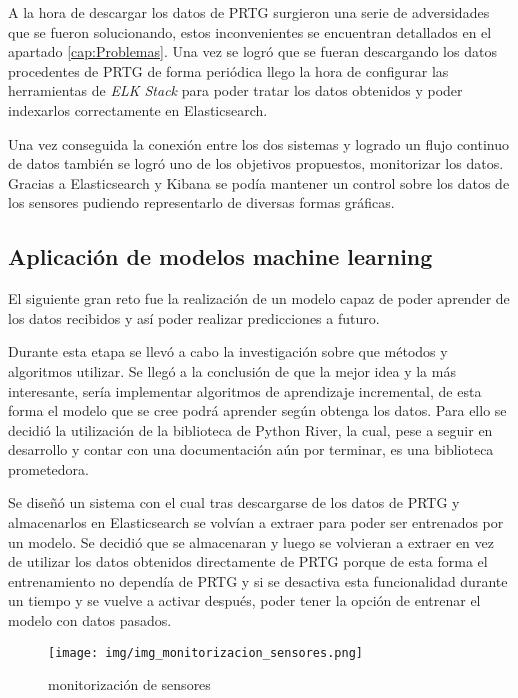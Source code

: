 A la hora de descargar los datos de PRTG surgieron una serie de adversidades que se fueron solucionando, estos inconvenientes se encuentran detallados en el apartado \ref{cap:Problemas}. Una vez se logró que se fueran descargando los datos procedentes de PRTG de forma periódica llego la hora de configurar las herramientas de \textit{ELK Stack} para poder tratar los datos obtenidos y poder indexarlos correctamente en Elasticsearch.

Una vez conseguida la conexión entre los dos sistemas y logrado un flujo continuo de datos también se logró uno de los objetivos propuestos, monitorizar los datos. Gracias a Elasticsearch y Kibana se podía mantener un control sobre los datos de los sensores pudiendo representarlo de diversas formas gráficas.

\subsection{Aplicación de modelos machine learning}

El siguiente gran reto fue la realización de un modelo capaz de poder aprender de los datos recibidos y así poder realizar predicciones a futuro.

Durante esta etapa se llevó a cabo la investigación sobre que métodos y algoritmos utilizar. Se llegó a la conclusión de que la mejor idea y la más interesante, sería implementar algoritmos de aprendizaje incremental, de esta forma el modelo que se cree podrá aprender según obtenga los datos. Para ello se decidió la utilización de la biblioteca de Python River, la cual, pese a seguir en desarrollo y contar con una documentación aún por terminar, es una biblioteca prometedora.

Se diseñó un sistema con el cual tras descargarse de los datos de PRTG y almacenarlos en Elasticsearch se volvían a extraer para poder ser entrenados por un modelo. Se decidió que se almacenaran y luego se volvieran a extraer en vez de utilizar los datos obtenidos directamente de PRTG porque de esta forma el entrenamiento no dependía de PRTG y si se desactiva esta funcionalidad durante un tiempo y se vuelve a activar después, poder tener la opción de entrenar el modelo con datos pasados.

\begin{figure}[h]
	\centering
	\texttt{[image: img/img\_monitorizacion\_sensores.png]}
	\caption{monitorización de sensores}
	\label{img_monitorizacion_sensores}
\end{figure}


